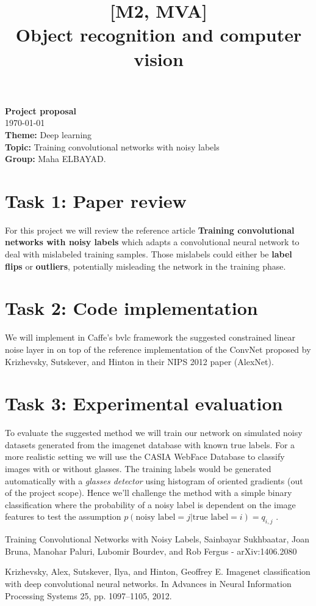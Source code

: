 \documentclass[11pt]{article}
\title{[M2, MVA]\\ Object recognition and computer vision}
\date{}
\begin{document}
\maketitle
\vspace{-30pt}
\begin{center}
{\huge \bf Project proposal}\\
\today \\
\vspace{5pt}
\textbf{Theme:} Deep learning \\
\textbf{Topic:} Training convolutional networks with noisy labels\\
\textbf{Group:} Maha ELBAYAD.
\end{center}

\section*{Task 1: Paper review}
For this project we will review the reference article \textbf{Training convolutional networks with noisy labels} \cite{Sukhb} which adapts a convolutional neural network to deal with mislabeled training samples. Those mislabels could either be \textbf{label flips} or \textbf{outliers}, potentially misleading the network in the training phase.

\section*{Task 2: Code implementation}
We will implement in Caffe's bvlc framework the suggested constrained linear noise layer in \cite{Sukhb} on top of the reference implementation of the ConvNet proposed by Krizhevsky, Sutskever, and Hinton in their NIPS 2012 paper (AlexNet)\cite{imagenet}. 

\section*{Task 3: Experimental evaluation} 
To evaluate the suggested method we will train our network on simulated noisy datasets generated from the imagenet database with known true labels. For a more realistic setting we will use the CASIA WebFace Database to classify images with or without glasses. The training labels would be generated automatically with a \textit{glasses detector} using histogram of oriented gradients (out of the project scope). Hence we'll challenge the method with a simple binary classification where the probability of a noisy label is dependent on the image features to test  the assumption $p(\text{noisy label}= j|\text{true label} = i) = q_{i,j}$ \cite{Sukhb}.
\begin{thebibliography}{2}
Training Convolutional Networks with Noisy Labels, Sainbayar Sukhbaatar, Joan Bruna, Manohar Paluri, Lubomir Bourdev, and Rob Fergus - arXiv:1406.2080

 Krizhevsky, Alex, Sutskever, Ilya, and Hinton, Geoffrey E. Imagenet classification with deep convolutional
neural networks. In Advances in Neural Information Processing Systems 25, pp. 1097–1105, 2012.
\end{thebibliography}
\end{document}
